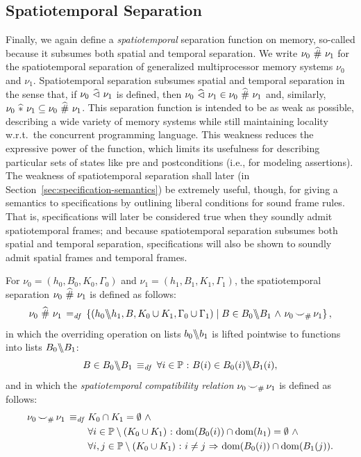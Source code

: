 \documentclass[11pt]{report}
\begin{document}
\subsection{Spatiotemporal Separation}
\label{sec:spatiotemporal-separation}

Finally, we again define a \emph{spatiotemporal} separation function on memory, so-called because it subsumes both spatial and temporal separation. We write $\nu_0 \operatorname{\,\widehat{\#}\,} \nu_1$ for the spatiotemporal separation of generalized multiprocessor memory systems $\nu_0$ and $\nu_1$. Spatiotemporal separation subsumes spatial and temporal separation in the sense that, if $\nu_0 \operatorname{\,\widehat{\vartriangleleft}\,} \nu_1$ is defined, then $\nu_0 \operatorname{\,\widehat{\vartriangleleft}\,} \nu_1 \in \nu_0 \operatorname{\,\widehat{\#}\,} \nu_1$ and, similarly, $\nu_0 \operatorname{\,\widehat{\ast}\,} \nu_1 \subseteq \nu_0 \operatorname{\,\widehat{\#}\,} \nu_1$. This separation function is intended to be as weak as possible, describing a wide variety of memory systems while still maintaining locality w.r.t.\ the concurrent programming language. This weakness reduces the expressive power of the function, which limits its usefulness for describing particular sets of states like pre and postconditions (i.e., for modeling assertions). The weakness of spatiotemporal separation shall later (in Section~\ref{sec:specification-semantics}) be extremely useful, though, for giving a semantics to specifications by outlining liberal conditions for sound frame rules. That is, specifications will later be considered true when they soundly admit spatiotemporal frames; and because spatiotemporal separation subsumes both spatial and temporal separation, specifications will also be shown to soundly admit spatial frames and temporal frames. 

For $\nu_0 = (h_0,B_0,K_0,\Gamma_0)$ and $\nu_1 = (h_1,B_1,K_1,\Gamma_1)$, the spatiotemporal separation $\nu_0 \operatorname{\,\widehat{\#}\,} \nu_1$ is defined as follows: \[ \nu_0 \operatorname{\,\widehat{\#}\,} \nu_1 \operatorname{\;=_{\mathit{df}}\;} \left\lbrace (h_0 \backslash\!\!\backslash h_1, B, K_0 \cup K_1, \Gamma_0 \cup \Gamma_1) \mid B \in B_0 \backslash\!\!\backslash B_1 \operatorname{\,\wedge\,} \nu_0 \operatorname{\smile}_\# \nu_1 \right\rbrace,\] in which the overriding operation on lists $b_0 \backslash\!\!\backslash b_1$ is lifted pointwise to functions into lists $B_0 \backslash\!\!\backslash B_1$: \[ B \in B_0 \backslash\!\!\backslash B_1 \operatorname{\;\equiv_{\mathit{df}}\;} \forall i \in \mathbb{P} \operatorname{\,:\,} B(i) \in B_0(i) \backslash\!\!\backslash B_1(i),\] and in which the \emph{spatiotemporal compatibility relation} $\nu_0 \operatorname{\smile}_\# \nu_1$ is defined as follows: 
\begin{align*}
\nu_0 \operatorname{\smile}_\# \nu_1 \operatorname{\;\equiv_{\mathit{df}}\;} & K_0 \cap K_1 = \operatorname{\emptyset} \operatorname{\,\wedge\,} \\ 
  & \forall i \in \mathbb{P} \setminus (K_0 \cup K_1) \operatorname{\,:\,} \operatorname{\mathrm{dom}}(B_0(i)) \cap \operatorname{\mathrm{dom}}(h_1) = \operatorname{\emptyset} \operatorname{\,\wedge\,} \\  
  & \forall i,j \in \mathbb{P} \setminus (K_0 \cup K_1) \operatorname{\,:\,} i \neq j \operatorname{\,\Rightarrow\,} \operatorname{\mathrm{dom}}(B_0(i)) \cap \operatorname{\mathrm{dom}}(B_1(j)). 
\end{align*}
\end{document}
